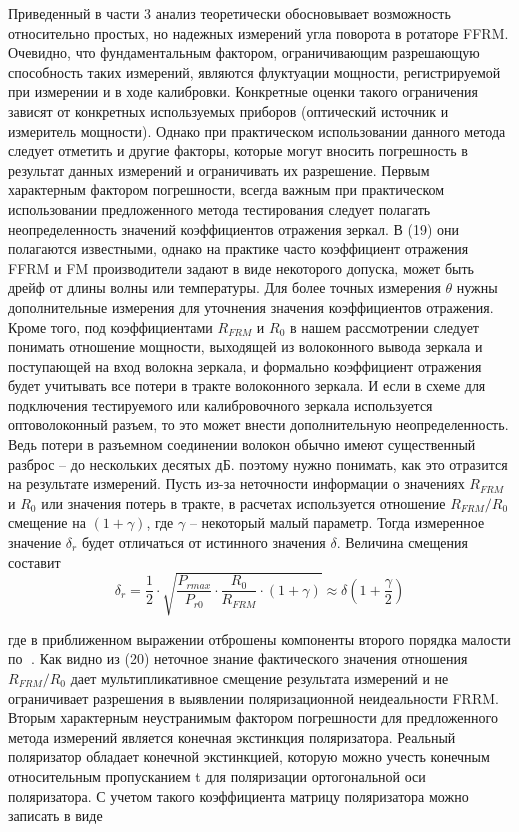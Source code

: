 \documentclass{article}
\begin{document}
Приведенный в части 3 анализ теоретически обосновывает возможность относительно простых, но надежных измерений угла поворота в ротаторе FFRM.
Очевидно, что фундаментальным фактором, ограничивающим разрешающую способность таких измерений, являются флуктуации мощности, регистрируемой при измерении и в ходе калибровки.
Конкретные оценки такого ограничения зависят от конкретных используемых приборов (оптический источник и измеритель мощности).
Однако при практическом использовании данного метода следует отметить и другие факторы, которые могут вносить погрешность в результат данных измерений и ограничивать их разрешение.   
Первым характерным фактором погрешности, всегда важным при практическом использовании предложенного метода тестирования следует полагать неопределенность значений коэффициентов отражения зеркал.
В (19) они полагаются известными, однако на практике часто коэффициент отражения FFRM и FM производители задают в виде некоторого допуска, может быть дрейф от длины волны или температуры.
Для более точных измерения $\theta$ нужны дополнительные измерения для уточнения значения коэффициентов отражения.
Кроме того, под коэффициентами $R_{FRM}$ и $R_0$ в нашем рассмотрении следует понимать отношение мощности, выходящей из волоконного вывода зеркала и поступающей на вход волокна зеркала, и формально коэффициент отражения будет учитывать все потери в тракте волоконного зеркала. И если в схеме для подключения тестируемого или калибровочного зеркала используется оптоволоконный разъем, то это может внести дополнительную неопределенность. Ведь потери в разъемном соединении волокон обычно имеют существенный разброс – до нескольких десятых дБ. поэтому нужно понимать, как это отразится на результате измерений. Пусть из-за неточности информации о значениях $R_{FRM}$ и $R_0$ или значения потерь в тракте, в расчетах используется отношение $R_{FRM}/R_0$ смещение на $(1+\gamma)$, где $\gamma$ – некоторый малый параметр. Тогда измеренное значение $\delta_r$ будет отличаться от истинного значения $\delta$. Величина смещения составит    
\begin{equation}
    \delta_r=\frac{1}{2}\cdot\sqrt{\frac{P_{rmax}}{P_{r0}}\cdot\frac{R_0}{R_{FRM}}\cdot(1+\gamma)}\approx\delta\left( 1+\frac{\gamma}{2} \right)
\end{equation}

где в приближенном выражении отброшены компоненты второго порядка малости по .
Как видно из (20) неточное знание фактического значения отношения $R_{FRM}/R_0$ дает мультипликативное смещение результата измерений и не ограничивает разрешения в выявлении поляризационной неидеальности FRRM.
Вторым характерным неустранимым фактором погрешности для предложенного метода измерений является конечная экстинкция поляризатора. Реальный поляризатор обладает конечной экстинкцией, которую можно учесть конечным относительным пропусканием t для поляризации ортогональной оси поляризатора. С учетом такого коэффициента матрицу поляризатора можно записать в виде      
\end{document}
